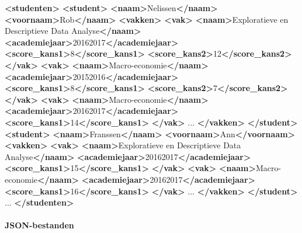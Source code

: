 \documentclass[]{memoir}
\newenvironment{Shaded}{\begin{snugshade}}{\end{snugshade}}
\newcommand{\KeywordTok}[1]{\textcolor[rgb]{0.13,0.29,0.53}{\textbf{#1}}}
\newcommand{\NormalTok}[1]{#1}
\let\oldparagraph\paragraph
\renewcommand{\paragraph}[1]{\oldparagraph{#1}\mbox{}}
\begin{document}
\begin{itemize}
\begin{Shaded}
\begin{Highlighting}[]
\KeywordTok{<studenten>}
  \KeywordTok{<student>}
\KeywordTok{<naam>}\NormalTok{Nelissen}\KeywordTok{</naam>}
\KeywordTok{<voornaam>}\NormalTok{Rob}\KeywordTok{</naam>}
\KeywordTok{<vakken>}
  \KeywordTok{<vak>}
    \KeywordTok{<naam>}\NormalTok{Exploratieve en Descriptieve Data Analyse}\KeywordTok{</naam>}
    \KeywordTok{<academiejaar>}\NormalTok{20162017}\KeywordTok{</academiejaar>}
    \KeywordTok{<score_kans1>}\NormalTok{8}\KeywordTok{</score_kans1>}
    \KeywordTok{<score_kans2>}\NormalTok{12}\KeywordTok{</score_kans2>}
  \KeywordTok{</vak>}
  \KeywordTok{<vak>}
    \KeywordTok{<naam>}\NormalTok{Macro-economie}\KeywordTok{</naam>}
    \KeywordTok{<academiejaar>}\NormalTok{20152016}\KeywordTok{</academiejaar>}
    \KeywordTok{<score_kans1>}\NormalTok{8}\KeywordTok{</score_kans1>}
    \KeywordTok{<score_kans2>}\NormalTok{7}\KeywordTok{</score_kans2>}
  \KeywordTok{</vak>}
  \KeywordTok{<vak>}
    \KeywordTok{<naam>}\NormalTok{Macro-economie}\KeywordTok{</naam>}
    \KeywordTok{<academiejaar>}\NormalTok{20162017}\KeywordTok{</academiejaar>}
    \KeywordTok{<score_kans1>}\NormalTok{14}\KeywordTok{</score_kans1>}
  \KeywordTok{</vak>}
\NormalTok{  ...}
\KeywordTok{</vakken>}
  \KeywordTok{</student>}
  \KeywordTok{<student>}
\KeywordTok{<naam>}\NormalTok{Franssen}\KeywordTok{</naam>}
\KeywordTok{<voornaam>}\NormalTok{Ann}\KeywordTok{</voornaam>}
\KeywordTok{<vakken>}
  \KeywordTok{<vak>}
    \KeywordTok{<naam>}\NormalTok{Exploratieve en Descriptieve Data Analyse}\KeywordTok{</naam>}
    \KeywordTok{<academiejaar>}\NormalTok{20162017}\KeywordTok{</academiejaar>}
    \KeywordTok{<score_kans1>}\NormalTok{15}\KeywordTok{</score_kans1>}
  \KeywordTok{</vak>}
  \KeywordTok{<vak>}
    \KeywordTok{<naam>}\NormalTok{Macro-economie}\KeywordTok{</naam>}
    \KeywordTok{<academiejaar>}\NormalTok{20162017}\KeywordTok{</academiejaar>}
    \KeywordTok{<score_kans1>}\NormalTok{16}\KeywordTok{</score_kans1>}
  \KeywordTok{</vak>}
\NormalTok{  ...}
\KeywordTok{</vakken>}
  \KeywordTok{</student>}
\NormalTok{  ...}
\KeywordTok{</studenten>}
\end{Highlighting}
\end{Shaded}
\end{itemize}

\paragraph{JSON-bestanden}\label{json-bestanden}
\end{document}
